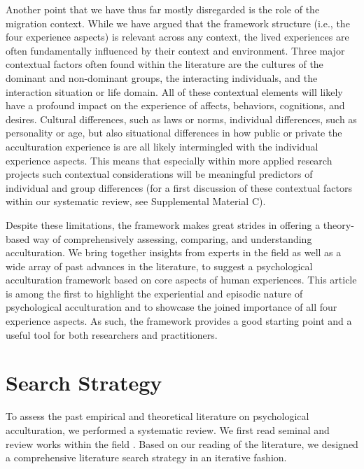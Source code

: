 \documentclass[man, 12pt, a4paper, mask]{apa7}
\begin{document}
Another point that we have thus far mostly disregarded is the role of the migration context. While we have argued that the framework structure (i.e., the four experience aspects) is relevant across any context, the lived experiences are often fundamentally influenced by their context and environment. Three major contextual factors often found within the literature are the cultures of the dominant and non-dominant groups, the interacting individuals, and the interaction situation or life domain. All of these contextual elements will likely have a profound impact on the experience of affects, behaviors, cognitions, and desires. Cultural differences, such as laws or norms, individual differences, such as personality or age, but also situational differences in how public or private the acculturation experience is are all likely intermingled with the individual experience aspects. This means that especially within more applied research projects such contextual considerations will be meaningful predictors of individual and group differences (for a first discussion of these contextual factors within our systematic review, see Supplemental Material C). 

Despite these limitations, the framework makes great strides in offering a theory-based way of comprehensively assessing, comparing, and understanding acculturation.
We bring together insights from experts in the field as well as a wide array of past advances in the literature, to suggest a psychological acculturation framework based on core aspects of human experiences.
This article is among the first to highlight the experiential and episodic nature of psychological acculturation and to showcase the joined importance of all four experience aspects. 
As such, the framework provides a good starting point and a useful tool for both researchers and practitioners. 


\printbibliography

\appendix

\section{Search Strategy}
\label{app:AppendixSearchStrategy}

To assess the past empirical and theoretical literature on psychological acculturation, we performed a systematic review. We first read seminal and review works within the field \citep[including,][]{Ward2019, Berry1997b, Berry2003, Szapocznik1978, Sam2006a, Rudmin2003a}. Based on our reading of the literature, we designed a comprehensive literature search strategy in an iterative fashion. 
\end{document}

